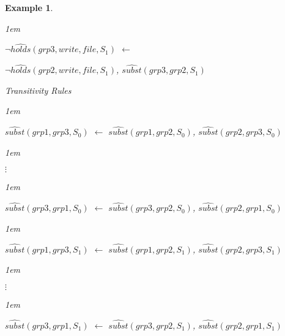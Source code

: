 \documentclass[11pt]{report}
\newtheorem{vexample}{Example}[chapter]
\newenvironment{vquote}
{
  \begin{list}{}{\leftmargin 1em}\item[]
}
{
  \end{list}
}
\begin{document}
\begin{vexample}
\begin{enumerate}
                \begin{vquote}
                  $\lnot\hat{holds}(grp3, write, file, S_{1})$ $\leftarrow$
               
                  \hspace{1em}
                  $\lnot\hat{holds}(grp2, write, file, S_{1})$,
                  $\hat{subst}(grp3, grp2, S_{1})$
                \end{vquote}

              \item
                Transitivity Rules

                \begin{vquote}
                  $\hat{subst}(grp1, grp3, S_{0})$ $\leftarrow$
                  $\hat{subst}(grp1, grp2, S_{0})$,
                  $\hat{subst}(grp2, grp3, S_{0})$
                \end{vquote}
    
                \begin{vquote}
                  \hspace{2em}$\vdots$
                \end{vquote}
    
                \begin{vquote}
                  $\hat{subst}(grp3, grp1, S_{0})$ $\leftarrow$
                  $\hat{subst}(grp3, grp2, S_{0})$,
                  $\hat{subst}(grp2, grp1, S_{0})$
                \end{vquote}
    
                \begin{vquote}
                  $\hat{subst}(grp1, grp3, S_{1})$ $\leftarrow$
                  $\hat{subst}(grp1, grp2, S_{1})$,
                  $\hat{subst}(grp2, grp3, S_{1})$
                \end{vquote}
    
                \begin{vquote}
                  \hspace{2em}$\vdots$
                \end{vquote}
    
                \begin{vquote}
                  $\hat{subst}(grp3, grp1, S_{1})$ $\leftarrow$
                  $\hat{subst}(grp3, grp2, S_{1})$,
                  $\hat{subst}(grp2, grp1, S_{1})$
                \end{vquote}


\end{enumerate}
\end{vexample}
\end{document}
